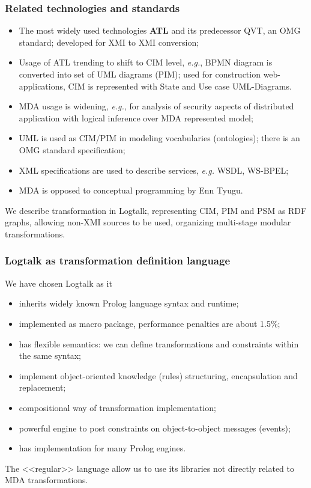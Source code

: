\documentclass[10pt]{beamer}
\begin{document}
\begin{frame}
  \frametitle{Related technologies and standards}
  \begin{itemize}
  \item The most widely used technologies \textbf{ATL} and its predecessor QVT, an OMG standard; developed for XMI to XMI conversion;
  \item Usage of ATL trending to shift to CIM level, \emph{e.g.}, BPMN diagram is converted into set of UML diagrams (PIM); used for construction web-applications, CIM is represented with State and Use case UML-Diagrams.
  \item MDA usage is widening, \emph{e.g.}, for analysis of security aspects of distributed application with logical inference over MDA represented model;
  \item UML is used as CIM/PIM in modeling vocabularies (ontologies); there is an OMG standard specification;
  \item XML specifications are used to describe services, \emph{e.g.} WSDL, WS-BPEL;
  \item MDA is opposed to conceptual programming by Enn Tyugu.
  \end{itemize}

  We describe transformation in Logtalk, representing CIM, PIM and PSM as RDF graphs, allowing non-XMI sources to be used, organizing multi-stage modular transformations.
\end{frame}
\begin{frame}
  \frametitle{Logtalk as transformation definition language}
  We have chosen Logtalk as it
  \begin{itemize}
  \item inherits widely known Prolog language syntax and runtime;
  \item implemented as macro package, performance penalties are about 1.5\%;
  \item has flexible semantics: we can define transformations and constraints within the same syntax;
  \item implement object-oriented knowledge (rules) structuring, encapsulation and replacement;
  \item compositional way of transformation implementation;
  \item powerful engine to post constraints on object-to-object messages (events);
  \item has implementation for many Prolog engines.
  \end{itemize}
  The <<regular>> language allow us to use its libraries not directly related to MDA transformations.
\end{frame}
\end{document}
